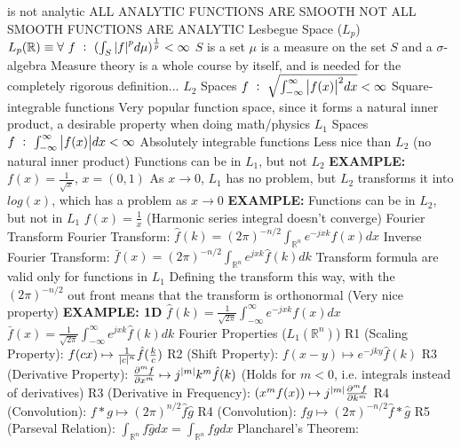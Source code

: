 \documentclass[14pt]{extarticle}
\begin{document}
\begin{outline}
								is not analytic
						\4	ALL ANALYTIC FUNCTIONS ARE SMOOTH
						\4	NOT ALL SMOOTH FUNCTIONS ARE ANALYTIC	
			\1	Lesbegue Space ($L_p$)
				\2 $L_p(\mathbb{R}) \equiv \forall~f~:~(\int_S \abs{f}^p d\mu)^{\frac{1}{p}} < \infty$
					\3	$S$ is a set
					\3	$\mu$ is a measure on the set $S$ and a $\sigma$-algebra
					\3	Measure theory is a whole course by itself, and is needed for the
							completely rigorous definition...
				\2	$L_2$ Spaces
					\3	$f~:~\sqrt{\int_{-\infty}^{\infty} \abs{f(x)}^2 dx} < \infty$
					\3	Square-integrable functions
					\3	Very popular function space, since it forms a natural inner
							product, a desirable property when doing math/physics
				\2	$L_1$ Spaces
					\3	$f~:~\int_{-\infty}^{\infty} \abs{f(x)} dx < \infty$
					\3	Absolutely integrable functions
					\3	Less nice than $L_2$ (no natural inner product)
					\3	Functions can be in $L_1$, but not $L_2$
					\3	\textbf{EXAMPLE:}
						\4	$f(x) = \frac{1}{\sqrt{x}}$, $x = (0,1)$
						\4	As $x \rightarrow 0$, $L_1$ has no problem, but $L_2$ transforms
								it into $log(x)$, which has a problem as $x \rightarrow 0$
					\3	\textbf{EXAMPLE:}
					\3	Functions can be in $L_2$, but not in $L_1$
						\4	$f(x) = \frac{1}{x}$ (Harmonic series integral doesn't converge)
			\1	Fourier Transform
				\2	Fourier Transform: $\hat{f}(k) = (2\pi)^{-n/2} \int_{\mathbb{R}^n}e^{-jxk}f(x) dx$
				\2	Inverse Fourier Transform: $\bar{f}(x) = (2\pi)^{-n/2} \int_{\mathbb{R}^n}e^{jxk} \hat{f}(k) dk$
				\2	Transform formula are valid only for functions in $L_1$
				\2	Defining the transform this way, with the $(2\pi)^{-n/2}$ out front
						means that the transform is orthonormal (Very nice property)
				\2	\textbf{EXAMPLE: 1D}
					\3	$\hat{f}(k) = \frac{1}{\sqrt{2\pi}} \int_{-\infty}^{\infty} e^{-jxk}f(x) dx$
					\3	$\bar{f}(x) = \frac{1}{\sqrt{2\pi}} \int_{-\infty}^{\infty} e^{jxk} \hat{f}(k) dk$
			\1	Fourier Properties ($L_1(\mathbb{R}^n)$)
				\2	R1 (Scaling Property):	$f(cx) \mapsto \frac{1}{\abs{c}^n} \hat{f}(\frac{k}{c})$
				\2	R2 (Shift Property): $f(x - y) \mapsto e^{-jky}\hat{f}(k)$
				\2	R3 (Derivative Property): $\pd[m]{f}{x} \mapsto j^{\abs{m}}k^m \hat{f}(k)$
					\3	(Holds for $m < 0$, i.e. integrals instead of derivatives)
				\2	R3	(Derivative in Frequency): $(x^mf(x)) \mapsto j^{\abs{m}} \pd[m]{f}{k}$
				\2	R4 (Convolution):	$f * g \mapsto (2\pi)^{n/2} \hat{f}\hat{g}$
				\2	R4 (Convolution):	$fg \mapsto (2\pi)^{-n/2}\hat{f} * \hat{g}$
				\2	R5 (Parseval Relation): $\int_{\mathbb{R}^n} f \hat{g} dx = \int_{\mathbb{R}^n}\hat{f}gdx$
				\2	Plancharel's Theorem:	

\end{outline}
\end{document}
